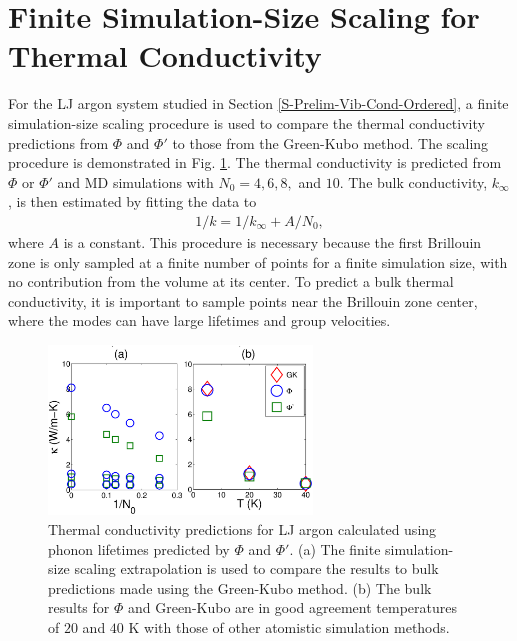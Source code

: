 \documentclass[letterpaper,12pt]{article}
\begin{document}
\section{\label{A-Finite-Sim}Finite Simulation-Size Scaling for Thermal Conductivity}
For the LJ argon system studied in Section \ref{S-Prelim-Vib-Cond-Ordered}, a finite simulation-size scaling procedure\cite{turney2009a,He2011a} is used to compare the thermal conductivity predictions from $\Phi$ and $\Phi'$ to those from the Green-Kubo method. The scaling procedure is demonstrated in Fig$.$ \ref{FIG:LJ_COND}. The thermal conductivity is predicted from $\Phi$ or $\Phi'$ and MD simulations with $N_0 = 4,6,8,$ and $10$. The bulk conductivity, $k_{\infty}$, is then estimated by fitting the data to
\begin{equation}\label{k_size}
\begin{split}
1/k = 1/k_{\infty} + A/N_0,
\end{split}
\end{equation}
where $A$ is a constant. This procedure is necessary because the first Brillouin zone is only sampled at a finite number of points for a finite simulation size, with no contribution from the volume at its center. To predict a bulk thermal conductivity, it is important to sample points near the Brillouin zone center, where the modes can have large lifetimes and group velocities.\cite{turney2009a,sellan2010b} 
\begin{figure}
\begin{center}
\includegraphics[angle=0,width=70.0mm]{LJ_NMD_SED_COND_2.eps}
\end{center}
\caption{\label{FIG:LJ_COND} Thermal conductivity predictions for LJ argon calculated using phonon lifetimes predicted by $\Phi$ and $\Phi'$.\cite{Larkin2012} (a) The finite simulation-size scaling extrapolation \cite{turney2009a,He2011a} is used to compare the results to bulk predictions made using the Green-Kubo method. (b) The bulk results for $\Phi$ and Green-Kubo are in good agreement temperatures of $20$ and $40$ K with those of other atomistic simulation methods.\cite{turney2009a}}
\end{figure}
\end{document}
